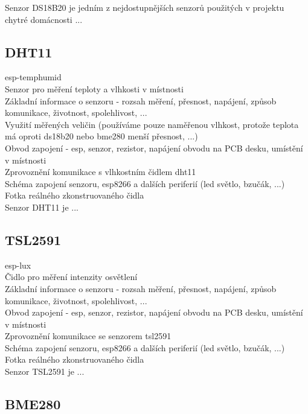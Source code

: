 Senzor DS18B20 je jedním z nejdostupnějších senzorů použitých v projektu chytré domácnosti ...

\subsection{DHT11}

esp-temphumid \\
Senzor pro měření teploty a  vlhkosti v místnosti \\
Základní informace o senzoru - rozsah měření, přesnost, napájení, způsob komunikace, životnost, spolehlivost, ... \\
Využití měřených veličin (používáme pouze naměřenou vlhkost, protože teplota má oproti ds18b20 nebo bme280 menší přesnost, ...) \\
Obvod zapojení - esp, senzor, rezistor, napájení obvodu na PCB desku, umístění v místnosti \\
Zprovoznění komunikace s vlhkostním čidlem dht11\\
Schéma zapojení senzoru, esp8266 a dalších periferií (led světlo, bzučák, ...) \\
Fotka reálného zkonstruovaného čidla \\

Senzor DHT11 je ...

\subsection{TSL2591}

esp-lux \\
Čidlo pro měření intenzity osvětlení \\
Základní informace o senzoru - rozsah měření, přesnost, napájení, způsob komunikace, životnost, spolehlivost, ... \\
Obvod zapojení - esp, senzor, rezistor, napájení obvodu na PCB desku, umístění v místnosti \\
Zprovoznění komunikace se senzorem tsl2591 \\
Schéma zapojení senzoru, esp8266 a dalších periferií (led světlo, bzučák, ...) \\
Fotka reálného zkonstruovaného čidla \\

Senzor TSL2591 je ...

\subsection{BME280}

